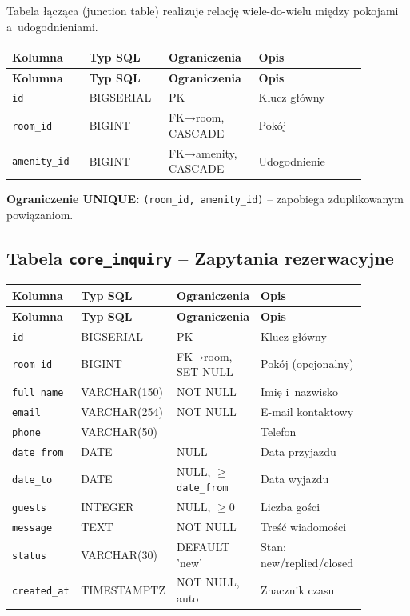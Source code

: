\documentclass[12pt,a4paper]{article}
\begin{document}
Tabela łącząca (junction table) realizuje relację wiele-do-wielu między pokojami
a~udogodnieniami.

\begin{longtable}{p{0.2\linewidth}p{0.2\linewidth}p{0.2\linewidth}p{0.28\linewidth}}
\toprule
\textbf{Kolumna} & \textbf{Typ SQL} & \textbf{Ograniczenia} & \textbf{Opis} \\
\midrule
\endfirsthead
\toprule
\textbf{Kolumna} & \textbf{Typ SQL} & \textbf{Ograniczenia} & \textbf{Opis} \\
\midrule
\endhead
\texttt{id} & BIGSERIAL & PK & Klucz główny \\
\texttt{room\_id} & BIGINT & FK→room, CASCADE & Pokój \\
\texttt{amenity\_id} & BIGINT & FK→amenity, CASCADE & Udogodnienie \\
\bottomrule
\end{longtable}

\textbf{Ograniczenie UNIQUE:} \texttt{(room\_id, amenity\_id)} -- zapobiega
zduplikowanym powiązaniom.

\subsection{Tabela \texttt{core\_inquiry} -- Zapytania rezerwacyjne}

\begin{longtable}{p{0.2\linewidth}p{0.18\linewidth}p{0.18\linewidth}p{0.32\linewidth}}
\toprule
\textbf{Kolumna} & \textbf{Typ SQL} & \textbf{Ograniczenia} & \textbf{Opis} \\
\midrule
\endfirsthead
\toprule
\textbf{Kolumna} & \textbf{Typ SQL} & \textbf{Ograniczenia} & \textbf{Opis} \\
\midrule
\endhead
\texttt{id} & BIGSERIAL & PK & Klucz główny \\
\texttt{room\_id} & BIGINT & FK→room, SET NULL & Pokój (opcjonalny) \\
\texttt{full\_name} & VARCHAR(150) & NOT NULL & Imię i~nazwisko \\
\texttt{email} & VARCHAR(254) & NOT NULL & E-mail kontaktowy \\
\texttt{phone} & VARCHAR(50) & & Telefon \\
\texttt{date\_from} & DATE & NULL & Data przyjazdu \\
\texttt{date\_to} & DATE & NULL, $\geq$\texttt{date\_from} & Data wyjazdu \\
\texttt{guests} & INTEGER & NULL, $\geq 0$ & Liczba gości \\
\texttt{message} & TEXT & NOT NULL & Treść wiadomości \\
\texttt{status} & VARCHAR(30) & DEFAULT 'new' & Stan: new/replied/closed \\
\texttt{created\_at} & TIMESTAMPTZ & NOT NULL, auto & Znacznik czasu \\
\bottomrule
\end{longtable}
\end{document}
